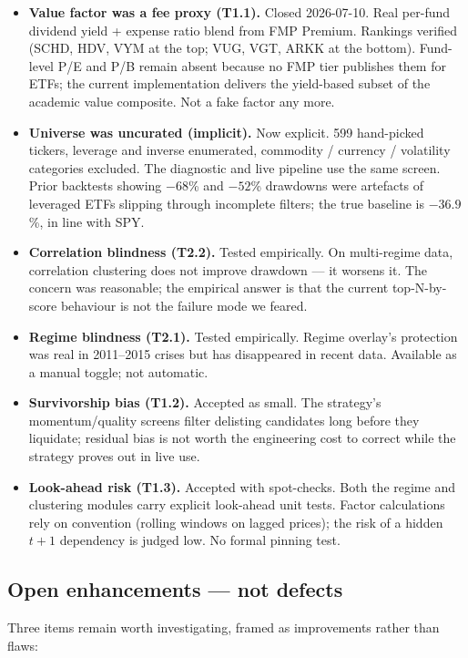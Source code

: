 \documentclass[11pt,a4paper]{article}
\begin{document}
\begin{itemize}[noitemsep]
    \item \textbf{Value factor was a fee proxy (T1.1).} Closed 2026-07-10. Real per-fund dividend yield + expense ratio blend from FMP Premium. Rankings verified (SCHD, HDV, VYM at the top; VUG, VGT, ARKK at the bottom). Fund-level P/E and P/B remain absent because no FMP tier publishes them for ETFs; the current implementation delivers the yield-based subset of the academic value composite. Not a fake factor any more.
    \item \textbf{Universe was uncurated (implicit).} Now explicit. 599 hand-picked tickers, leverage and inverse enumerated, commodity / currency / volatility categories excluded. The diagnostic and live pipeline use the same screen. Prior backtests showing $-68$\% and $-52$\% drawdowns were artefacts of leveraged ETFs slipping through incomplete filters; the true baseline is $-36.9$\%, in line with SPY.
    \item \textbf{Correlation blindness (T2.2).} Tested empirically. On multi-regime data, correlation clustering does not improve drawdown --- it worsens it. The concern was reasonable; the empirical answer is that the current top-N-by-score behaviour is not the failure mode we feared.
    \item \textbf{Regime blindness (T2.1).} Tested empirically. Regime overlay's protection was real in 2011--2015 crises but has disappeared in recent data. Available as a manual toggle; not automatic.
    \item \textbf{Survivorship bias (T1.2).} Accepted as small. The strategy's momentum/quality screens filter delisting candidates long before they liquidate; residual bias is not worth the engineering cost to correct while the strategy proves out in live use.
    \item \textbf{Look-ahead risk (T1.3).} Accepted with spot-checks. Both the regime and clustering modules carry explicit look-ahead unit tests. Factor calculations rely on convention (rolling windows on lagged prices); the risk of a hidden $t{+}1$ dependency is judged low. No formal pinning test.
\end{itemize}

\subsection{Open enhancements --- not defects}

Three items remain worth investigating, framed as improvements rather than flaws:
\end{document}
